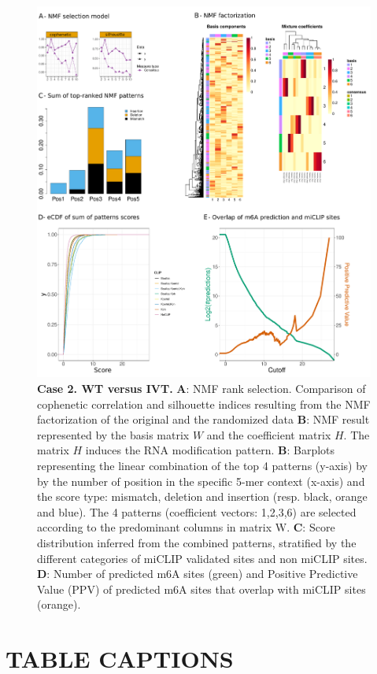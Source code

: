 \documentclass[times, 11pt, a4paper]{article}
\begin{document}
\newpage
\begin{figure}[h!]
	\includegraphics[width = 1\textwidth]{img/res_wt_ivt.pdf}
	\caption{\textbf{Case 2. WT  versus IVT.}  \textbf{A}: NMF rank selection. Comparison of cophenetic correlation and silhouette indices resulting from the NMF factorization of the original and the randomized data \textbf{B}: NMF result represented by the basis matrix $W$ and the coefficient matrix $H$. The matrix $H$ induces the RNA modification pattern. \textbf{B}: Barplots representing the linear combination of the top 4 patterns (y-axis) by by the number of position in the specific 5-mer context (x-axis) and the score type: mismatch, deletion and insertion (resp. black, orange and blue). The 4 patterns (coefficient vectors: 1,2,3,6) are selected according to the predominant columns in matrix W.  \textbf{C}: Score distribution inferred from the combined patterns, stratified by the different categories of miCLIP validated sites and non miCLIP sites.  \textbf{D}: Number of predicted m6A sites (green) and Positive Predictive Value (PPV) of predicted m6A sites that overlap with miCLIP sites (orange). }
	\label{fig:WT_IVT}
\end{figure}
\newpage
\section*{TABLE CAPTIONS}
\end{document}
